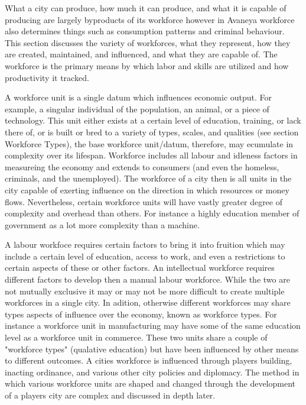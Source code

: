 


What a city can produce, how much it can produce, and what it is capable of producing are largely byproducts of its workforce however in Avaneya workforce also determines things such as consumption patterns and criminal behaviour. This section discusses the variety of workforces, what they represent, how they are created, maintained, and influenced, and what they are capable of. The workforce is the primary means by which labor and skills are utilized and how productivity it tracked.

A workforce unit is a single datum which influences economic output. For example, a singular individual of the population, an animal, or a piece of technology. This unit either exists at a certain level of education, training, or lack there of, or is built or bred to a variety of types, scales, and qualities (see section Workforce Types), the base workforce unit/datum, therefore, may ecumulate in complexity over its lifespan. Workforce includes all labour and idleness factors in measureing the economy and extends to consumers (and even the homeless, criminals, and the unemployed). The workforce of a city then is all units in the city capable of exerting influence on the direction in which resources or money flows. Nevertheless, certain workforce units will have vastly greater degree of complexity and overhead than others. For instance a highly education member of government as a lot more complexity than a machine. %

A labour workfoce requires certain factors to bring it into fruition which may include a certain level of education, access to work, and even a restrictions to certain aspects of these or other factors. An intellectual workforce requires different factors to develop then a manual labour workforce. While the two are not mutually exclusive it may or may not be more difficult to create multiple workforces in a single city. In adition, otherwise different workforces may share types aspects of influence over the economy, known as workforce types. For instance a workforce unit in manufacturing may have some of the same education level as a workforce unit in commerce. These two units share a couple of "workforce types" (qualative education) but have been influenced by other means to different outcomes. A cities workforce is influenced through players building, inacting ordinance, and various other  city policies and diplomacy. The method in which various workforce units are shaped and changed through the development of a players city are complex and discussed in depth later.

